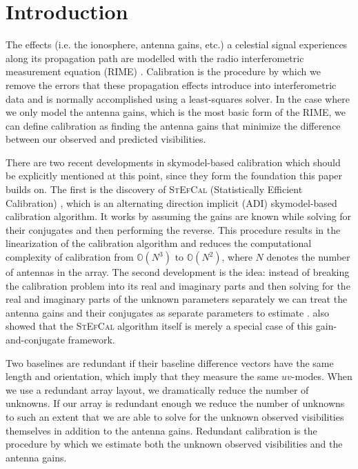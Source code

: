 \documentclass[useAMS,usenatbib]{mn2e}
\begin{document}
\section{Introduction}
The effects (i.e. the ionosphere, antenna gains, etc.) a celestial signal experiences along its propagation path are modelled with the radio interferometric measurement equation (RIME) \citep{ME1,RRIME1}.
Calibration is the procedure by which we remove the errors that these propagation effects introduce into interferometric data and is normally accomplished using a 
least-squares solver. In the case where we only model the antenna gains, which is the most basic form of the RIME, we can define calibration as finding the antenna gains that minimize the difference between our observed and predicted visibilities. 

There are two recent developments in skymodel-based calibration which should be explicitly mentioned at this point, since they form the foundation this paper builds on. The first is the discovery of \textsc{StEfCal} (Statistically Efficient Calibration) \citep{Mitchell:MWA-cal,Salvini2014}, which 
is an alternating direction implicit (ADI) skymodel-based calibration algorithm. It works by assuming the gains are known while solving for their conjugates and then performing the reverse. 
This procedure results in the linearization of the calibration algorithm and reduces the computational complexity of calibration from $\mathbb{O}(N^3)$ to $\mathbb{O}(N^2)$, where $N$ denotes the number of antennas in the array. 
The second development is the idea: instead of breaking the calibration problem 
into its real and imaginary parts and then solving for the real and imaginary parts of the unknown parameters separately we can treat the antenna gains and their 
conjugates as separate parameters to estimate \citep{Smirnov2015}. \citet{Smirnov2015} also showed that the \textsc{StEfCal} algorithm itself is merely a special case of this
gain-and-conjugate framework. 

Two baselines are redundant if their baseline difference vectors have the same length and orientation, which imply that they measure the same $uv$-modes. When we use a redundant array layout, we dramatically 
reduce the number of unknowns. If our array is redundant enough we reduce the number of unknowns to such an extent that we are able to solve for the unknown 
observed visibilities themselves in addition to the antenna gains. Redundant calibration is the procedure by which we estimate both the unknown observed visibilities and the antenna gains.
\end{document}
